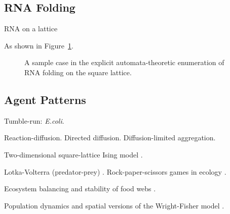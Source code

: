 \documentclass{acm_proc_article-sp}
\begin{document}
\subsection{RNA Folding}

RNA on a lattice \cite{LeoniVanderzande2003,JostEveraers2010,ZaraPretti2007,GillespieMayneJiang2009}


As shown in Figure~\ref{fig:rna}.

\begin{figure}
\caption{
\label{fig:rna}
A sample case in the explicit automata-theoretic enumeration of RNA folding on the square lattice.
}
\end{figure}

\subsection{Agent Patterns}

Tumble-run: {\em E.coli}.
\cite{RosserEtAl2013}


Reaction-diffusion.
Directed diffusion.
Diffusion-limited aggregation.
\cite{DLA}

Two-dimensional square-lattice Ising model \cite{Onsager1944}.

Lotka-Volterra (predator-prey) \cite{LotkaVolterra,SpatialLotkaVolterra}.
Rock-paper-scissors games in ecology \cite{Tainaka2000}.

Ecosystem balancing and stability of food webs \cite{quince2005topological}.

Population dynamics and spatial versions of the Wright-Fisher model \cite{MathiesonMcVean2013}.
\end{document}
